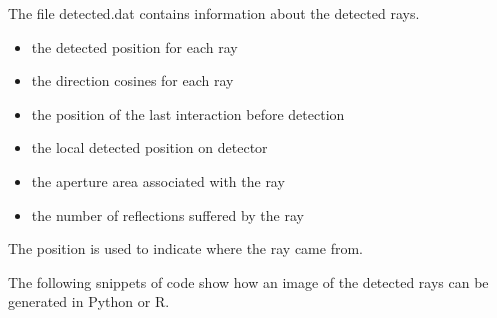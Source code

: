 \documentclass[letterpaper,10pt,english]{sphinxmanual}
\begin{document}
The file detected.dat contains information about the detected rays.
\begin{itemize}
\item {} 
  the detected position for each ray

\item {} 
  the direction cosines for each ray

\item {} 
  the position of the last interaction before detection

\item {} 
 the local detected position on detector

\item {} 
  the aperture area associated with the ray

\item {} 
 the number of reflections suffered by the ray

\end{itemize}

The position  is used to indicate where the ray came from.

The following snippets of code show how an image of the detected rays can be
generated in Python or R.

%
\begin{sphinxVerbatim}[commandchars=\\\{\}]
   
 
 
\end{sphinxVerbatim}
\end{document}

